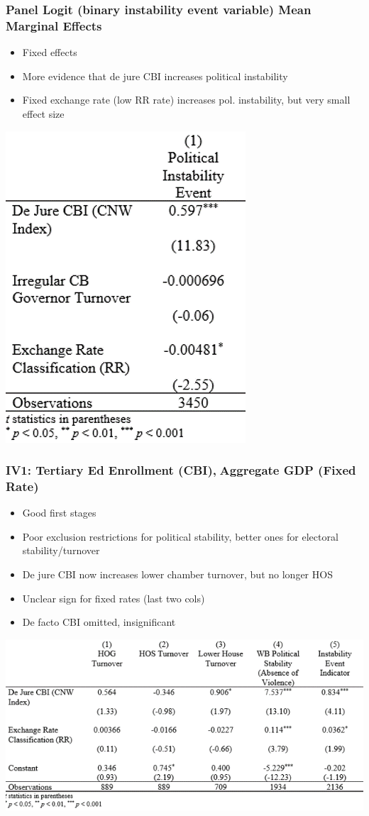 \documentclass[]{beamer}
\begin{document}
\begin{frame}
    \frametitle{Panel Logit (binary instability event variable) Mean Marginal Effects}
    \begin{itemize}
        \item Fixed effects
        \item More evidence that de jure CBI increases political instability
        \item Fixed exchange rate (low RR rate) increases pol. instability, but very small effect size
    \end{itemize}
    \includegraphics{img0005.png}
\end{frame}


\begin{frame}
    \frametitle{IV1: Tertiary Ed Enrollment (CBI),Aggregate GDP (Fixed Rate)}
    \begin{itemize}
        \item Good first stages
        \item Poor exclusion restrictions for political stability, better ones for electoral stability/turnover
        \item De jure CBI now increases lower chamber turnover, but no longer HOS
        \item Unclear sign for fixed rates (last two cols)
        \item De facto CBI omitted, insignificant
    \end{itemize}
    \includegraphics{img0006.png}
\end{frame}
\end{document}
